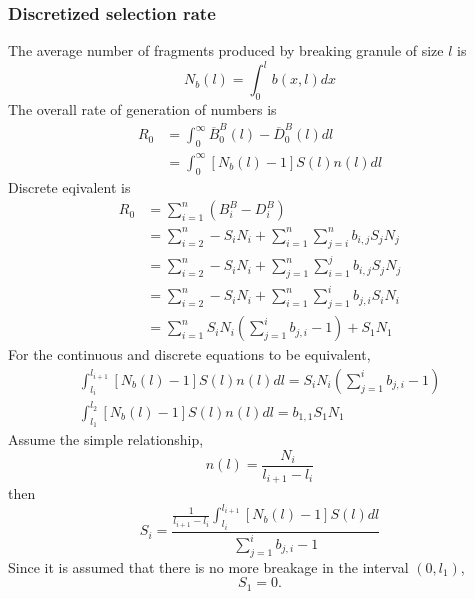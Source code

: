 \documentclass[12pt]{article}
\begin{document}
\subsubsection{Discretized selection rate}
The average number of fragments produced by breaking granule of size $l$ is
\begin{equation}
N_b(l)=\int_0^lb(x,l)dx
\end{equation}
The overall rate of generation of numbers is
\begin{equation}
\begin{aligned}
R_0&=\int_0^\infty\overline{B}_0^B(l)-\overline{D}_0^B(l)dl\\
&=\int_0^\infty\left[N_b(l)-1\right]S(l)n(l)dl
\end{aligned}
\end{equation}
Discrete eqivalent is
\begin{equation}
\begin{aligned}
R_0&=\sum_{i=1}^n(B_i^B-D_i^B)\\
&=\sum_{i=2}^n-S_iN_i+\sum_{i=1}^n\sum_{j=i}^nb_{i,j}S_jN_j\\
&=\sum_{i=2}^n-S_iN_i+\sum_{j=1}^n\sum_{i=1}^jb_{i,j}S_jN_j\\
&=\sum_{i=2}^n-S_iN_i+\sum_{i=1}^n\sum_{j=1}^ib_{j,i}S_iN_i\\
&=\sum_{i=1}^nS_iN_i\left(\sum_{j=1}^ib_{j,i}-1\right)+S_1N_1
\end{aligned}
\end{equation}
For the continuous and discrete equations to be equivalent,
\begin{equation}
\begin{aligned}
\int_{l_i}^{l_{i+1}}[N_b(l)-1]S(l)n(l)dl=S_iN_i\left(\sum_{j=1}^ib_{j,i}-1\right)\\
\int_{l_1}^{l_2}[N_b(l)-1]S(l)n(l)dl=b_{1,1}S_1N_1
\end{aligned}
\end{equation}
Assume the simple relationship,
\begin{equation}
n(l)=\frac{N_i}{l_{i+1}-l_i}
\end{equation}
then
\begin{equation}
S_i=\frac{\frac{1}{l_{i+1}-l_i}\int_{l_i}^{l_{i+1}}\left[N_b(l)-1\right]S(l)dl}{\sum_{j=1}^ib_{j,i}-1}
\end{equation}
Since it is assumed that there is no more breakage in the interval $(0,l_1)$,
\begin{equation}
S_1=0.
\end{equation}
\end{document}
